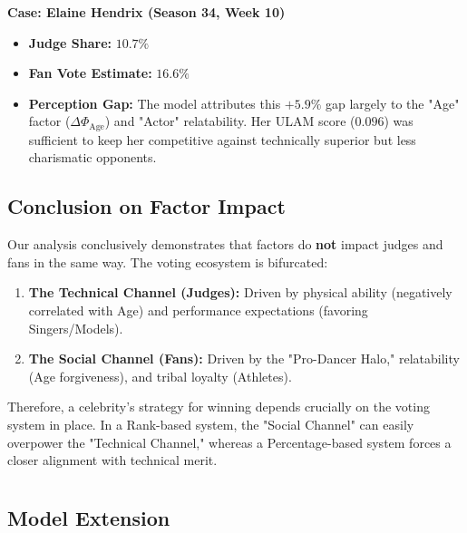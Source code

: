 \documentclass[12pt]{article}
\begin{document}
\textbf{Case: Elaine Hendrix (Season 34, Week 10)}
\begin{itemize}
    \item \textbf{Judge Share:} $10.7\%$
    \item \textbf{Fan Vote Estimate:} $16.6\%$
    \item \textbf{Perception Gap:} The model attributes this $+5.9\%$ gap largely to the "Age" factor ($\Delta \Phi_{\text{Age}}$) and "Actor" relatability. Her ULAM score ($0.096$) was sufficient to keep her competitive against technically superior but less charismatic opponents.
\end{itemize}

\subsection{Conclusion on Factor Impact}

Our analysis conclusively demonstrates that factors do \textbf{not} impact judges and fans in the same way. The voting ecosystem is bifurcated:
\begin{enumerate}
    \item \textbf{The Technical Channel (Judges):} Driven by physical ability (negatively correlated with Age) and performance expectations (favoring Singers/Models).
    \item \textbf{The Social Channel (Fans):} Driven by the "Pro-Dancer Halo," relatability (Age forgiveness), and tribal loyalty (Athletes).
\end{enumerate}
Therefore, a celebrity's strategy for winning depends crucially on the voting system in place. In a Rank-based system, the "Social Channel" can easily overpower the "Technical Channel," whereas a Percentage-based system forces a closer alignment with technical merit.



\section{}
\subsection{Model Extension}



\subsection{}
\end{document}
